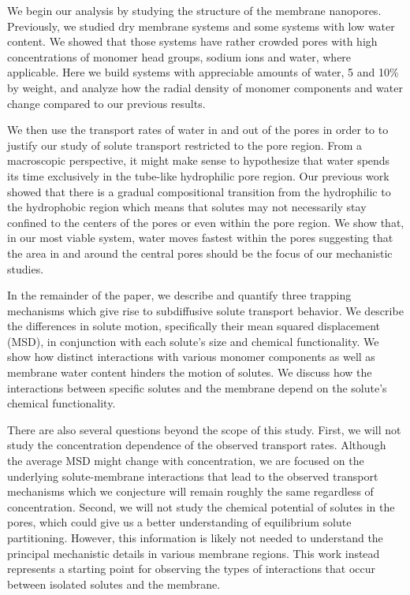 \documentclass[journal=jpcbfk,manuscript=article]{achemso}
\begin{document}
  We begin our analysis by studying the structure of the membrane nanopores.
  Previously, we studied dry membrane systems and some systems with low water
  content. We showed that those systems have rather crowded pores with high
  concentrations of monomer head groups, sodium ions and water, where applicable.
  Here we build systems with appreciable amounts of water, 5 and 10\% by weight,
  and analyze how the radial density of monomer components and water change
  compared to our previous results.
 
  We then use the transport rates of water in and out of the pores in order to
  to justify our study of solute transport restricted to the pore region. From a 
  macroscopic perspective, it might make sense to hypothesize that water spends its time 
  exclusively in the tube-like hydrophilic pore region. Our previous work showed
  that there is a gradual compositional transition from the hydrophilic to the
  hydrophobic region which means that solutes may not necessarily stay confined
  to the centers of the pores or even within the pore region. We show that, in 
  our most viable system, water moves fastest within the pores suggesting that 
  the area in and around the central pores should be the focus of our mechanistic studies.

  In the remainder of the paper, we describe and quantify three trapping 
  mechanisms which give rise to subdiffusive solute transport behavior. 
  We describe the differences in solute motion, specifically their mean
  squared displacement (MSD), in conjunction with each solute's size and 
  chemical functionality. We show how distinct interactions with various
  monomer components as well as membrane water content hinders the motion 
  of solutes. We discuss how the interactions between specific solutes and
  the membrane depend on the solute's chemical functionality.

  There are also several questions beyond the scope of this study.
  First, we will not study the concentration dependence of the observed transport
  rates. Although the average MSD might change with concentration, we are 
  focused on the underlying solute-membrane interactions that lead to the 
  observed transport mechanisms which we conjecture will remain roughly
  the same regardless of concentration. Second, we will not study the chemical potential
  of solutes in the pores, which could give us a better understanding of 
  equilibrium solute partitioning. However, this information is likely
  not needed to understand the principal mechanistic details in various membrane
  regions. This work instead represents a starting point for observing the 
  types of interactions that occur between isolated solutes and the membrane.
\end{document}
